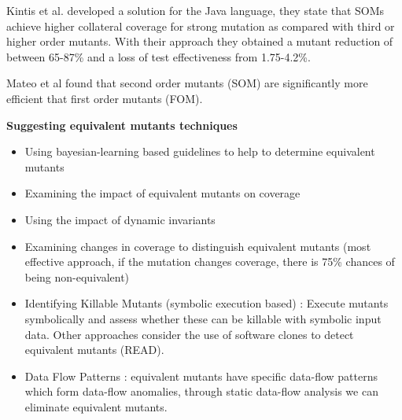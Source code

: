\begin{itemize}
	Kintis et al. \cite{kintis2010evaluating} developed a solution for the Java language, they state that SOMs achieve higher collateral coverage for strong mutation as compared with third or higher order mutants. With their approach they obtained a mutant reduction of between 65-87\% and a loss of test effectiveness from 1.75-4.2\%.

	Mateo et al \cite{mateo2012validating,madeyski2013overcoming} found that second order mutants (SOM) are significantly more efficient that first order mutants (FOM).

\end{itemize}	

\textbf{Suggesting equivalent mutants techniques}

\begin{itemize}
	\item Using bayesian-learning based guidelines to help to determine equivalent mutants \cite{maldonado2005bayesian}
	\item Examining the impact of equivalent mutants on coverage \cite{grun2009impact}
	\item Using the impact of dynamic invariants \cite{schuler2009efficient}
	\item Examining changes in coverage to distinguish equivalent mutants \cite{schuler2010covering,schuler2013covering} (most effective approach, if the mutation changes coverage, there is 75\% chances of being non-equivalent)
	\item Identifying Killable Mutants (symbolic execution based) \cite{papadakis2012mutation, holling2016nequivack}: Execute mutants symbolically and assess whether these can be killable with symbolic input data. 
	Other approaches consider the use of software clones to detect equivalent mutants \cite{kintis2013identifying} (READ).
	\item Data Flow Patterns \cite{kintis2014using,kintis2015medic}: equivalent mutants have specific data-flow patterns which form data-flow anomalies, through static data-flow analysis we can eliminate equivalent mutants.
\end{itemize}

